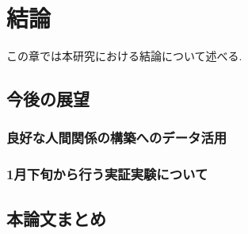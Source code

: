 \chapter{結論}
\label{chap:conclusion}

この章では本研究における結論について述べる.

\section{今後の展望}
\subsection{良好な人間関係の構築へのデータ活用}
\subsection{1月下旬から行う実証実験について}
\section{本論文まとめ}
